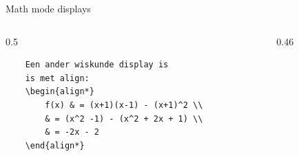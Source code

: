 \begin{frame}[fragile, t]{Math mode displays}
\begin{columns}[t]
    \begin{column}{0.5\textwidth}
    \begin{verbatim}
    Een ander wiskunde display is 
    is met align:
    \begin{align*}
        f(x) & = (x+1)(x-1) - (x+1)^2 \\
        & = (x^2 -1) - (x^2 + 2x + 1) \\
        & = -2x - 2
    \end{align*}
    \end{verbatim}
    \par
\end{column}

\begin{column}{0.46\textwidth}
    \vspace{1mm}
\end{column}
\end{columns}

\end{frame}